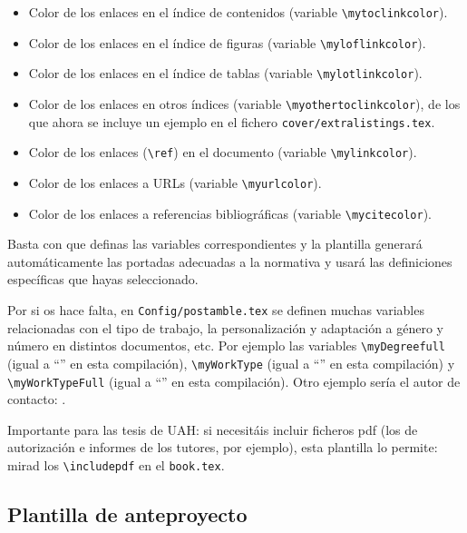 \begin{itemize}
  \item Color de los enlaces en el índice de contenidos (variable \texttt{\textbackslash{}mytoclinkcolor}).
  \item Color de los enlaces en el índice de figuras (variable \texttt{\textbackslash{}myloflinkcolor}).
  \item Color de los enlaces en el índice de tablas (variable \texttt{\textbackslash{}mylotlinkcolor}).
  \item Color de los enlaces en otros índices (variable \texttt{\textbackslash{}myothertoclinkcolor}), de los que ahora se incluye un ejemplo en el fichero \texttt{cover/extralistings.tex}.
  \item Color de los enlaces (\texttt{\textbackslash{}ref}) en el documento (variable \texttt{\textbackslash{}mylinkcolor}).
  \item Color de los enlaces a URLs (variable \texttt{\textbackslash{}myurlcolor}).
  \item Color de los enlaces a referencias bibliográficas (variable \texttt{\textbackslash{}mycitecolor}).
\end{itemize}

Basta con que definas las variables correspondientes y la plantilla generará automáticamente las portadas adecuadas a la normativa y usará las definiciones específicas que hayas seleccionado.

Por si os hace falta, en \texttt{Config/postamble.tex} se definen muchas variables relacionadas con el tipo de trabajo, la personalización y adaptación a género y número en distintos documentos, etc. Por ejemplo las variables \texttt{\textbackslash{}myDegreefull} (igual a ``\myDegreefull'' en esta compilación), \texttt{\textbackslash{}myWorkType} (igual a ``\myWorkType'' en esta compilación) y \texttt{\textbackslash{}myWorkTypeFull} (igual a ``\myWorkTypeFull'' en esta compilación). Otro ejemplo sería el autor de contacto: \contactauthor.

Importante para las tesis de UAH: si necesitáis incluir ficheros pdf (los de autorización e informes de los tutores, por ejemplo), esta plantilla lo permite: mirad los \texttt{\textbackslash{}includepdf} en el \texttt{book.tex}.

\subsection{Plantilla de anteproyecto}
\label{sec:plantilla-de-anteproyecto}


